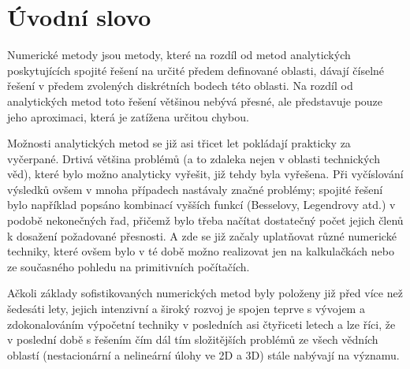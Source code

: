 \section{Úvodní slovo}
  Numerické metody jsou metody, které na rozdíl od metod analytických poskytujících spojité řešení
  na určité předem definované oblasti, dávají čísel\-né řešení v předem zvolených diskrétních
  bodech této oblasti. Na rozdíl od analytických metod toto řešení většinou nebývá přesné, ale
  představuje pouze jeho aproximaci, která je zatížena určitou chybou.
  
  Možnosti analytických metod se již asi třicet let pokládají prakticky za vyčerpané. Drtivá
  většina problémů (a to zdaleka nejen v oblasti technických věd), které bylo možno analyticky
  vyřešit, již tehdy byla vyřešena. Při vyčíslování výsledků ovšem v mnoha případech nastávaly
  značné problémy; spojité řešení bylo například popsáno kombinací vyšších funkcí (Besselovy,
  Legendrovy atd.) v podobě nekonečných řad, přičemž bylo třeba načítat dostatečný počet jejich
  členů k dosažení požadované přesnosti. A zde se již začaly uplatňovat různé numerické techniky,
  které ovšem bylo v té době možno realizovat jen na kalkulačkách nebo ze současného pohledu na
  primitivních počítačích.

  Ačkoli základy sofistikovaných numerických metod byly položeny již před více než šedesáti lety,
  jejich intenzivní a široký rozvoj je spojen teprve s vývojem a zdokonalováním výpočetní techniky
  v posledních asi čtyřiceti letech a lze říci, že v poslední době s řešením čím dál tím
  složitějších problémů ze všech vědních oblastí (nestacionární a nelineární úlohy ve 2D a 3D)
  stále nabývají na významu.


